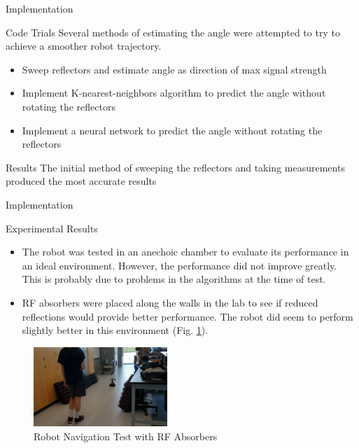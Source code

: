 \documentclass{beamer}
\begin{document}
\begin{frame}{Implementation}
\begin{block}{Code Trials}
Several methods of estimating the angle were attempted to try to achieve a smoother robot trajectory.
    \begin{itemize}
      \item Sweep reflectors and estimate angle as direction of max signal strength
      \item Implement K-nearest-neighbors algorithm to predict the angle without rotating the reflectors
      \item Implement a neural network to predict the angle without rotating the reflectors
    \end{itemize}
  \end{block}
  \begin{block}{Results}
    The initial method of sweeping the reflectors and taking measurements produced the most accurate results
  \end{block}
\end{frame}

\begin{frame}{Implementation}
\begin{block}{Experimental Results}
    \begin{itemize}
      \item The robot was tested in an anechoic chamber to evaluate its performance in an ideal environment. However, the performance did not improve greatly. This is probably due to problems in the algorithms at the time of test.
      \item RF absorbers were placed along the walls in the lab to see if reduced reflections would provide better performance. The robot did seem to perform slightly better in this environment (Fig. \ref{fig:AbsorberTest}).
    \end{itemize}
  \end{block}
    \begin{figure}
      \centering
      \includegraphics[height=3cm]{figs/img/Absorber_test.png}
      \caption{Robot Navigation Test with RF Absorbers}
      \label{fig:AbsorberTest}
    \end{figure}
\end{frame}
\end{document}
